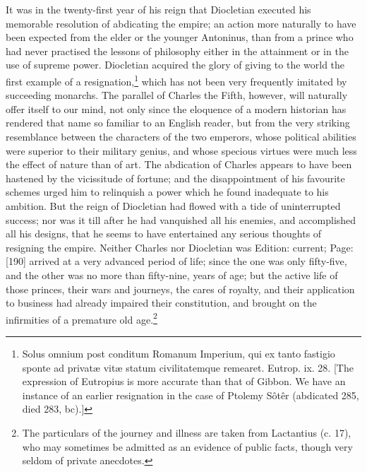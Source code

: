 It was in the twenty-first year of his reign that Diocletian executed his memorable resolution of abdicating the empire; an action more naturally to have been expected from the elder or the younger Antoninus, than from a prince who had never practised the lessons of philosophy either in the attainment or in the use of supreme power. Diocletian acquired the glory of giving to the world the first example of a resignation,\footnote{Solus omnium post conditum Romanum Imperium, qui ex tanto fastigio sponte ad privatæ vitæ statum civilitatemque remearet. Eutrop. ix. 28. [The expression of Eutropius is more accurate than that of Gibbon. We have an instance of an earlier resignation in the case of Ptolemy Sôtêr (abdicated 285, died 283, bc).]} which has not been very frequently imitated by succeeding monarchs. The parallel of Charles the Fifth, however, will naturally offer itself to our mind, not only since the eloquence of a modern historian has rendered that name so familiar to an English reader, but from the very striking resemblance between the characters of the two emperors, whose political abilities were superior to their military genius, and whose specious virtues were much less the effect of nature than of art. The abdication of Charles appears to have been hastened by the vicissitude of fortune; and the disappointment of his favourite schemes urged him to relinquish a power which he found inadequate to his ambition. But the reign of Diocletian had flowed with a tide of uninterrupted success; nor was it till after he had vanquished all his enemies, and accomplished all his designs, that he seems to have entertained any serious thoughts of resigning the empire. Neither Charles nor Diocletian was Edition: current; Page: [190] arrived at a very advanced period of life; since the one was only fifty-five, and the other was no more than fifty-nine, years of age; but the active life of those princes, their wars and journeys, the cares of royalty, and their application to business had already impaired their constitution, and brought on the infirmities of a premature old age.\footnote{The particulars of the journey and illness are taken from Lactantius (c. 17), who may sometimes be admitted as an evidence of public facts, though very seldom of private anecdotes.}

